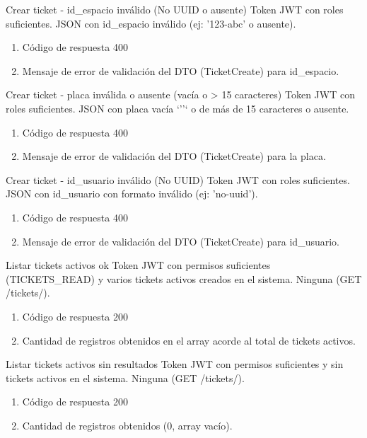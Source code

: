 {Crear ticket - id\_espacio inválido (No UUID o ausente)}
{Token JWT con roles suficientes.}
{JSON con id\_espacio inválido (ej: '123-abc' o ausente).}
{\begin{enumerate} [leftmargin=*, nosep]
    \item Código de respuesta 400
    \item Mensaje de error de validación del DTO (TicketCreate) para id\_espacio.
\end{enumerate}}

{Crear ticket - placa inválida o ausente (vacía o > 15 caracteres)}
{Token JWT con roles suficientes.}
{JSON con placa vacía `''` o de más de 15 caracteres o ausente.}
{\begin{enumerate} [leftmargin=*, nosep]
    \item Código de respuesta 400
    \item Mensaje de error de validación del DTO (TicketCreate) para la placa.
\end{enumerate}}

{Crear ticket - id\_usuario inválido (No UUID)}
{Token JWT con roles suficientes.}
{JSON con id\_usuario con formato inválido (ej: 'no-uuid').}
{\begin{enumerate} [leftmargin=*, nosep]
    \item Código de respuesta 400
    \item Mensaje de error de validación del DTO (TicketCreate) para id\_usuario.
\end{enumerate}}

{Listar tickets activos ok}
{Token JWT con permisos suficientes (TICKETS\_READ) y varios tickets activos creados en el sistema.}
{Ninguna (GET /tickets/).}
{\begin{enumerate} [leftmargin=*, nosep]
    \item Código de respuesta 200
    \item Cantidad de registros obtenidos en el array acorde al total de tickets activos.
\end{enumerate}}

{Listar tickets activos sin resultados}
{Token JWT con permisos suficientes y sin tickets activos en el sistema.}
{Ninguna (GET /tickets/).}
{\begin{enumerate} [leftmargin=*, nosep]
    \item Código de respuesta 200
    \item Cantidad de registros obtenidos (0, array vacío).
\end{enumerate}}

